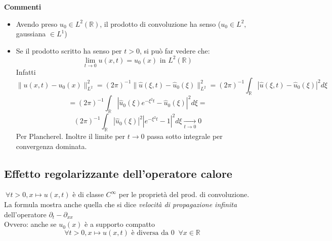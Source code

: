 \documentclass[a4paper]{article}
\newcommand{\R}{\mathbb{R}}
\begin{document}
\textbf{Commenti} 
\begin{itemize}
	\item Avendo preso $u_0 \in L^{2}(\R)$, il prodotto di convoluzione ha senso ($u_0\in L^2,$ gaussiana $\in L^1$)
	\item Se il prodotto scritto  ha senso per $t>0$, si può far vedere che:
		\[\lim_{t \to 0} u(x,t)=u_0(x)\text{ in }L^{2}(\R)\]
		Infatti
		\[ \|u(x,t)-u_0(x)\|^2_{L^2}=(2\pi)^{-1} \|\hat{u}(\xi,t)-\hat{u}_0(\xi)\|^2_{L^2}=(2\pi)^{-1} \int_{\R}^{} |\hat{u}(\xi, t)-\hat{u}_0(\xi)|^2d\xi\]
		\[=(2\pi)^{-1}\int_{\R}^{} |\hat{u}_0(\xi) e^{-\xi^2 t}-\hat{u}_0(\xi)|^2d\xi=\]
		\[(2\pi)^{-1}\int_{\R}^{} |\hat{u}_0(\xi)|^2 |e^{-\xi^2 t}-1|^2d\xi \xrightarrow[t\to 0]{}0\]
		Per Plancherel. Inoltre il limite per $t\to 0$ passa sotto integrale per convergenza dominata.
\end{itemize}
\subsection{Effetto regolarizzante dell'operatore calore}
$\ \forall t>0,x\mapsto u(x,t)$ è di classe $C^\infty$ per le proprietà del prod. di convoluzione.
\\La formula mostra anche quella che si dice \emph{velocità di propagazione infinita} dell'operatore $\partial_t-\partial_{x x}$ 
\\Ovvero: anche se $u_0(x)$ è a supporto compatto 
\[\ \forall t>0,x\mapsto u(x,t)\text{ è diversa da 0 }\ \forall x\in \R\]
\end{document}
